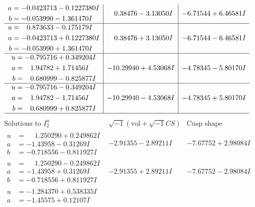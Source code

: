 \documentclass[1p]{elsarticle_modified}
\theoremstyle{definition}
\newcommand{\I}{\sqrt{-1}}
\begin{document}
$$\begin{array}{c|c|c}
\begin{aligned}
a &= -0.0423713 - 0.1227380 I \\
b &= -0.053990 - 1.361470 I\end{aligned}
 & \phantom{-}0.38476 - 3.13050 I & -6.71544 + 6.46581 I \\ \hline\begin{aligned}
u &= \phantom{-}0.873633 - 0.175179 I \\
a &= -0.0423713 + 0.1227380 I \\
b &= -0.053990 + 1.361470 I\end{aligned}
 & \phantom{-}0.38476 + 3.13050 I & -6.71544 - 6.46581 I \\ \hline\begin{aligned}
u &= -0.795716 + 0.349204 I \\
a &= \phantom{-}1.94782 + 1.71456 I \\
b &= \phantom{-}0.680999 - 0.825877 I\end{aligned}
 & -10.29940 + 4.53068 I & -4.78345 - 5.80170 I \\ \hline\begin{aligned}
u &= -0.795716 - 0.349204 I \\
a &= \phantom{-}1.94782 - 1.71456 I \\
b &= \phantom{-}0.680999 + 0.825877 I\end{aligned}
 & -10.29940 - 4.53068 I & -4.78345 + 5.80170 I\\
 \hline 
 \end{array}$$\newpage$$\begin{array}{c|c|c}  
\text{Solutions to }I^u_{2}& \I (\text{vol} + \sqrt{-1}CS) & \text{Cusp shape}\\
 \hline 
\begin{aligned}
u &= \phantom{-}1.250290 + 0.249862 I \\
a &= -1.43958 - 0.31269 I \\
b &= -0.718556 - 0.811927 I\end{aligned}
 & -2.91355 - 2.89211 I & -7.67752 + 2.98084 I \\ \hline\begin{aligned}
u &= \phantom{-}1.250290 - 0.249862 I \\
a &= -1.43958 + 0.31269 I \\
b &= -0.718556 + 0.811927 I\end{aligned}
 & -2.91355 + 2.89211 I & -7.67752 - 2.98084 I \\ \hline\begin{aligned}
u &= -1.284370 + 0.538335 I \\
a &= -1.45575 + 0.12107 I \\

\end{aligned}
\end{array}$$
\end{document}
